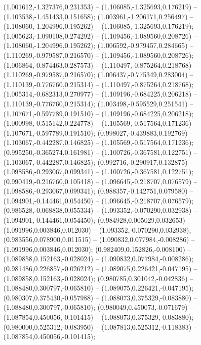  (1.001612,-1.327376,0.231353) -- (1.106085,-1.325693,0.176219) -- (1.103538,-1.451433,0.151658);
 (1.003961,-1.206171,0.256497) -- (1.108060,-1.204996,0.195262) -- (1.106085,-1.325693,0.176219);
 (1.005623,-1.090108,0.274292) -- (1.109456,-1.089560,0.208726) -- (1.108060,-1.204996,0.195262);
 (1.006592,-0.979457,0.284665) -- (1.110269,-0.979587,0.216570) -- (1.109456,-1.089560,0.208726);
 (1.006864,-0.874463,0.287573) -- (1.110497,-0.875264,0.218768) -- (1.110269,-0.979587,0.216570);
 (1.006437,-0.775349,0.283004) -- (1.110139,-0.776760,0.215314) -- (1.110497,-0.875264,0.218768);
 (1.005314,-0.682313,0.270977) -- (1.109196,-0.684225,0.206218) -- (1.110139,-0.776760,0.215314);
 (1.003498,-0.595529,0.251541) -- (1.107671,-0.597789,0.191510) -- (1.109196,-0.684225,0.206218);
 (1.000998,-0.515142,0.224778) -- (1.105569,-0.517564,0.171236) -- (1.107671,-0.597789,0.191510);
 (0.998027,-0.439883,0.192769) -- (1.103067,-0.442287,0.146825) -- (1.105569,-0.517564,0.171236);
 (0.995250,-0.365274,0.161981) -- (1.100726,-0.367581,0.122751) -- (1.103067,-0.442287,0.146825);
 (0.992716,-0.290917,0.132875) -- (1.098586,-0.293067,0.099341) -- (1.100726,-0.367581,0.122751);
 (0.990419,-0.216760,0.105418) -- (1.096645,-0.218707,0.076579) -- (1.098586,-0.293067,0.099341);
 (0.988357,-0.142751,0.079580) -- (1.094901,-0.144461,0.054450) -- (1.096645,-0.218707,0.076579);
 (0.986528,-0.068838,0.055334) -- (1.093352,-0.070290,0.032938) -- (1.094901,-0.144461,0.054450);
 (0.984928,0.005029,0.032653) -- (1.091996,0.003846,0.012030) -- (1.093352,-0.070290,0.032938);
 (0.983556,0.078900,0.011515) -- (1.090832,0.077984,-0.008286) -- (1.091996,0.003846,0.012030);
 (0.982409,0.152826,-0.008100) -- (1.089858,0.152163,-0.028024) -- (1.090832,0.077984,-0.008286);
 (0.981486,0.226857,-0.026212) -- (1.089075,0.226421,-0.047195) -- (1.089858,0.152163,-0.028024);
 (0.980785,0.301042,-0.042836) -- (1.088480,0.300797,-0.065810) -- (1.089075,0.226421,-0.047195);
 (0.980307,0.375430,-0.057988) -- (1.088073,0.375329,-0.083880) -- (1.088480,0.300797,-0.065810);
 (0.980049,0.450073,-0.071679) -- (1.087854,0.450056,-0.101415) -- (1.088073,0.375329,-0.083880);
 (0.980000,0.525312,-0.083950) -- (1.087813,0.525312,-0.118383) -- (1.087854,0.450056,-0.101415);
